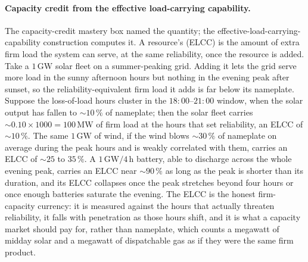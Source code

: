 \paragraph{Capacity credit from the effective load-carrying capability.} The
capacity-credit mastery box named the quantity; the effective-load-carrying-
capability construction computes it. A resource's  (ELCC) is the amount of extra firm load the system
can serve, at the same reliability, once the resource is added. Take a
$1\,\si{\giga\watt}$ solar fleet on a summer-peaking grid. Adding it lets the
grid serve more load in the sunny afternoon hours but nothing in the evening
peak after sunset, so the reliability-equivalent firm load it adds is far
below its nameplate. Suppose the loss-of-load hours cluster in the
$18{:}00$--$21{:}00$ window, when the solar output has fallen to $\sim 10\,\%$
of nameplate; then the solar fleet carries $\sim 0.10\times 1000 = 100\,\si{
\mega\watt}$ of firm load at the hours that set reliability, an ELCC of
$\sim 10\,\%$. The same $1\,\si{\giga\watt}$ of wind, if the wind blows
$\sim 30\,\%$ of nameplate on average during the peak hours and is weakly
correlated with them, carries an ELCC of $\sim 25$ to $35\,\%$. A
$1\,\si{\giga\watt}/4\,\si{\hour}$ battery, able to discharge across the whole
evening peak, carries an ELCC near $\sim 90\,\%$ as long as the peak is
shorter than its duration, and its ELCC collapses once the peak stretches
beyond four hours or once enough batteries saturate the evening. The ELCC is
the honest firm-capacity currency: it is measured against the hours that
actually threaten reliability, it falls with penetration as those hours shift,
and it is what a capacity market should pay for, rather than nameplate, which
counts a megawatt of midday solar and a megawatt of dispatchable gas as if
they were the same firm product.

